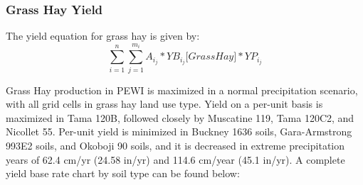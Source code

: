 \documentclass[11pt]{article}
\begin{document}
\subsubsection{Grass Hay Yield}
The yield equation for grass hay is given by:
$$\sum_{i=1}^{n} \sum_{j=1}^{m_i} A_i_j *YB_i_j\bigg[Grass Hay\bigg]*YP_i_j$$

Grass Hay production in PEWI is maximized in a normal precipitation scenario, with all grid cells in grass hay land use type. Yield on a per-unit basis is maximized in Tama 120B, followed closely by Muscatine 119, Tama 120C2, and Nicollet 55. Per-unit yield is minimized in Buckney 1636 soils, Gara-Armstrong 993E2 soils, and Okoboji 90 soils, and it is decreased in extreme precipitation years of 62.4 cm/yr (24.58 in/yr) and 114.6 cm/year (45.1 in/yr). A complete yield base rate chart by soil type can be found below:
\end{document}
